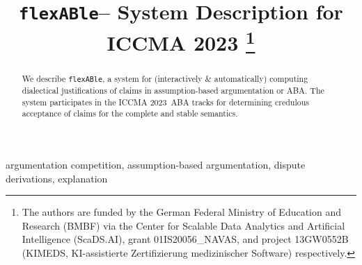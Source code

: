 \documentclass[conference]{IEEEtran}
\newcommand{\flexable}{\texttt{flexABle}\xspace}
\newcommand{\iccma}{ICCMA 2023}
\begin{document}
\title{\flexable -- System Description for \iccma
  \thanks{The authors are funded by the German Federal Ministry of Education and Research (BMBF) via the Center for Scalable Data Analytics and Artificial Intelligence (ScaDS.AI), grant  01IS20056\_NAVAS, and project 13GW0552B (KIMEDS, KI-assistierte Zertifizierung medizinischer Software) respectively.     }
}


\author{
\and    
{}
\and
{}
}





\maketitle

\begin{abstract} We describe \flexable, a system for (interactively \& automatically) computing dialectical justifications of claims in assumption-based argumentation or ABA.  The system participates in the \iccma~ABA tracks for determining credulous acceptance of claims for the complete and stable semantics.      
\end{abstract}

\begin{IEEEkeywords}
argumentation competition, assumption-based argumentation, dispute derivations, explanation
\end{IEEEkeywords}
\end{document}
